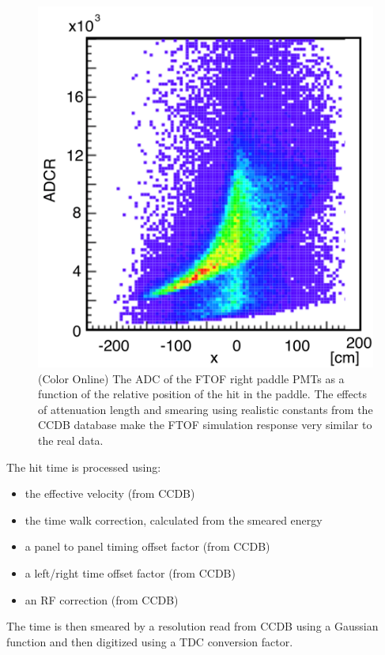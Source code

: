 \begin{figure}
	\centering
	\includegraphics[width=0.99\columnwidth,keepaspectratio]{img/ftofAtten.png}
	\caption{(Color Online) The ADC of the FTOF right paddle PMTs as a function of the relative position of the hit in the paddle. The effects of attenuation
				length and smearing using realistic constants from the CCDB database make the FTOF simulation response very similar to the real data.}
	\label{fig:ftofAtten}
\end{figure}

The hit time is processed using:

\begin{itemize}
	\item the effective velocity (from CCDB)
	\item the time walk correction, calculated from the smeared energy
	\item a panel to panel timing offset factor (from CCDB)
	\item a left/right time offset factor (from CCDB)
	\item an RF correction (from CCDB)
\end{itemize}

The time is then smeared by a resolution read from CCDB using a Gaussian function and then digitized using a TDC conversion factor.

